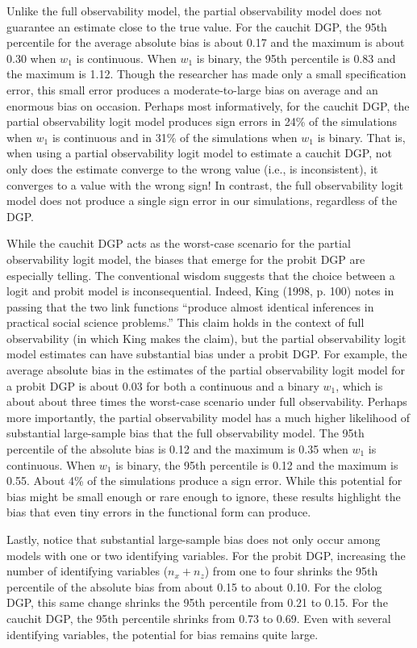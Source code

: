 \documentclass[10pt]{article}
\begin{document}
Unlike the full observability model, the partial observability model does not guarantee an estimate close to the true value. 
For the cauchit DGP, the 95th percentile for the average absolute bias is about 0.17 and the maximum is about 0.30 when $w_1$ is continuous. When $w_1$ is binary, the 95th percentile is 0.83 and the maximum is 1.12. 
Though the researcher has made only a small specification error, this small error produces a moderate-to-large bias on average and an enormous bias on occasion. 
Perhaps most informatively, for the cauchit DGP, the partial observability logit model produces sign errors in 24\% of the simulations when $w_1$ is continuous and in 31\% of the simulations when $w_1$ is binary. 
That is, when using a partial observability logit model to estimate a cauchit DGP, not only does the estimate converge to the wrong value (i.e., is inconsistent), it converges to a value with the wrong sign!
In contrast, the full observability logit model does not produce a single sign error in our simulations, regardless of the DGP.

While the cauchit DGP acts as the worst-case scenario for the partial observability logit model, the biases that emerge for the probit DGP are especially telling. 
The conventional wisdom suggests that the choice between a logit and probit model is inconsequential. 
Indeed, King (1998, p. 100) notes in passing that the two link functions ``produce almost identical inferences in practical social science problems.'' 
This claim holds in the context of full observability (in which King makes the claim), but the partial observability logit model estimates can have substantial bias under a probit DGP. 
For example, the average absolute bias in the estimates of the partial observability logit model for a probit DGP is about 0.03 for both a continuous and a binary $w_1$, which is about about three times the worst-case scenario under full observability.  
Perhaps more importantly, the partial observability model has a much higher likelihood of substantial large-sample bias that the full observability model. 
The 95th percentile of the absolute bias is 0.12 and the maximum is 0.35 when $w_1$ is continuous. When $w_1$ is binary, the 95th percentile is 0.12 and the maximum is 0.55.
About 4\% of the simulations produce a sign error. 
While this potential for bias might be small enough or rare enough to ignore, these results highlight the bias that even tiny errors in the functional form can produce.

Lastly, notice that substantial large-sample bias does not only occur among models with one or two identifying variables. 
For the probit DGP, increasing the number of identifying variables ($n_x + n_z$) from one to four shrinks the 95th percentile of the absolute bias from about 0.15 to about 0.10. 
For the clolog DGP, this same change shrinks the 95th percentile from 0.21 to 0.15. 
For the cauchit DGP, the 95th percentile shrinks from 0.73 to 0.69. 
Even with several identifying variables, the potential for bias remains quite large.
 
\end{document}
